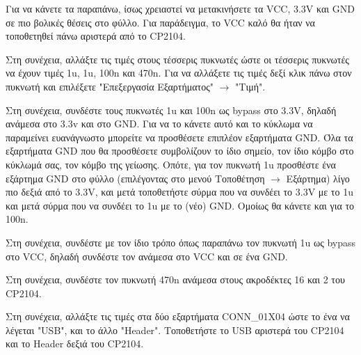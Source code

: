 \documentclass[a4paper]{article}
\begin{document}
Για να κάνετε τα παραπάνω, ίσως χρειαστεί να μετακινήσετε τα VCC, 3.3V και GND σε πιο βολικές θέσεις στο φύλλο. Για παράδειγμα, το VCC καλό θα ήταν να τοποθετηθεί πάνω αριστερά από το \textenglish{CP2104}.

\begin{figure}
  \begin{center}
    \label{fig:kicad-main}
  \end{center}
\end{figure}

Στη συνέχεια, αλλάξτε τις τιμές στους τέσσερις πυκνωτές ώστε οι τέσσερις πυκνωτές να έχουν τιμές 1u, 1u, 100n και 470n. Για να αλλάξετε τις τιμές δεξί κλικ πάνω στον πυκνωτή και επιλέξετε "Επεξεργασία Εξαρτήματος" $\rightarrow$ "Τιμή".

Στη συνέχεια, συνδέστε τους πυκνωτές 1u και 100n ως bypass στο 3.3V, δηλαδή ανάμεσα στο 3.3v και στο GND. Για να το κάνετε αυτό και το κύκλωμα να παραμείνει ευανάγνωστο μπορείτε να προσθέσετε επιπλέον εξαρτήματα GND. Όλα τα εξαρτήματα GND που θα προσθέσετε συμβολίζουν το ίδιο σημείο, τον ίδιο κόμβο στο κύκλωμά σας, τον κόμβο της γείωσης. Οπότε, για τον πυκνωτή 1u προσθέστε ένα εξάρτημα GND στο φύλλο (επιλέγοντας στο μενού Τοποθέτηση $\rightarrow$ Εξάρτημα) λίγο πιο δεξιά από το 3.3V, και μετά τοποθετήστε σύρμα που να συνδέει το 3.3V με το 1u και μετά σύρμα που να συνδέει το 1u με το (νέο) GND. Ομοίως θα κάνετε και για το 100n.

Στη συνέχεια, συνδέστε με τον ίδιο τρόπο όπως παραπάνω τον πυκνωτή 1u ως bypass στο VCC, δηλαδή συνδέστε τον ανάμεσα στο VCC και σε ένα GND.

Στη συνέχεια, συνδέστε τον πυκνωτή 470n ανάμεσα στους ακροδέκτες 16 και 2 του \textenglish{CP2104}.

Στη συνέχεια, αλλάξτε τις τιμές στα δύο εξαρτήματα CONN\_01X04 ώστε το ένα να λέγεται "USB", και το άλλο "Header". Τοποθετήστε το USB αριστερά του \textenglish{CP2104} και το Header δεξιά του \textenglish{CP2104}.

\begin{figure}
  \begin{center}
    \label{fig:kicad-main}
  \end{center}
\end{figure}
\end{document}

